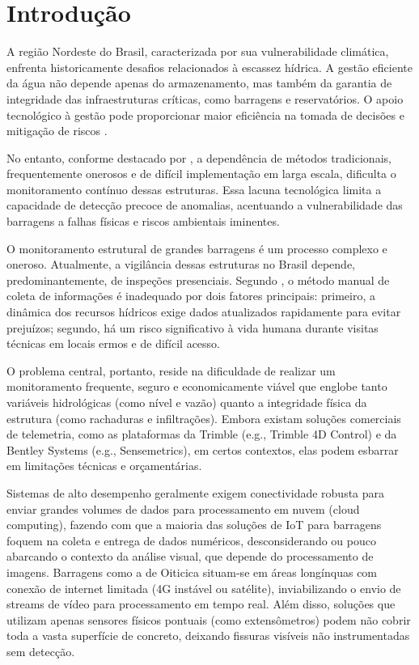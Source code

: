 \chapter{Introdução}
\label{cap:cap1}

A região Nordeste do Brasil, caracterizada por sua vulnerabilidade climática, enfrenta historicamente desafios relacionados à escassez hídrica. A gestão eficiente da água não depende apenas do armazenamento, mas também da garantia de integridade das infraestruturas críticas, como barragens e reservatórios. O apoio tecnológico à gestão pode proporcionar maior eficiência na tomada de decisões e mitigação de riscos \cite{hernandez2019}.

No entanto, conforme destacado por , a dependência de métodos tradicionais, frequentemente onerosos e de difícil implementação em larga escala, dificulta o monitoramento contínuo dessas estruturas. Essa lacuna tecnológica limita a capacidade de detecção precoce de anomalias, acentuando a vulnerabilidade das barragens a falhas físicas e riscos ambientais iminentes.

O monitoramento estrutural de grandes barragens é um processo complexo e oneroso. Atualmente, a vigilância dessas estruturas no Brasil depende, predominantemente, de inspeções presenciais. Segundo , o método manual de coleta de informações é inadequado por dois fatores principais: primeiro, a dinâmica dos recursos hídricos exige dados atualizados rapidamente para evitar prejuízos; segundo, há um risco significativo à vida humana durante visitas técnicas em locais ermos e de difícil acesso.

O problema central, portanto, reside na dificuldade de realizar um monitoramento frequente, seguro e economicamente viável que englobe tanto variáveis hidrológicas (como nível e vazão) quanto a integridade física da estrutura (como rachaduras e infiltrações). Embora existam soluções comerciais de telemetria, como as plataformas da Trimble (e.g., Trimble 4D Control) e da Bentley Systems (e.g., Sensemetrics), em certos contextos, elas podem esbarrar em limitações técnicas e orçamentárias.

Sistemas de alto desempenho geralmente exigem conectividade robusta para enviar grandes volumes de dados para processamento em nuvem (cloud computing), fazendo com que a maioria das soluções de IoT para barragens foquem na coleta e entrega de dados numéricos, desconsiderando ou pouco abarcando o contexto da análise visual, que depende do processamento de imagens. Barragens como a de Oiticica situam-se em áreas longínquas com conexão de internet limitada (4G instável ou satélite), inviabilizando o envio de streams de vídeo para processamento em tempo real. Além disso, soluções que utilizam apenas sensores físicos pontuais (como extensômetros) podem não cobrir toda a vasta superfície de concreto, deixando fissuras visíveis não instrumentadas sem detecção.

